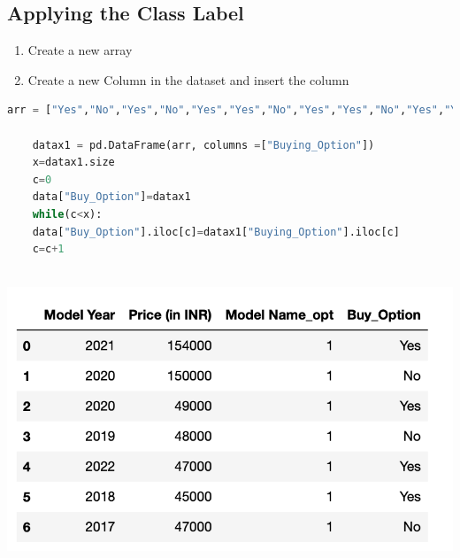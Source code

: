 \documentclass{article}
\begin{document}
\subsection{Applying the Class Label}
\begin{enumerate}
	\item Create a new array
	\item Create a new Column in the dataset and insert the column
\end{enumerate}

\begin{lstlisting}[language=Python]
	arr = ["Yes","No","Yes","No","Yes","Yes","No","Yes","Yes","No","Yes","Yes","No","Yes","Yes","No","Yes","Yes","No","Yes","Yes","No","Yes","Yes","No","Yes","Yes","No","Yes","Yes","No","Yes","Yes","No","Yes","Yes","No","Yes","Yes","No","Yes","Yes","No","Yes","Yes","No","Yes","Yes","No","Yes","Yes","No","Yes","Yes","No","Yes","Yes","No","Yes","Yes"]
	
	datax1 = pd.DataFrame(arr, columns =["Buying_Option"])
	x=datax1.size
	c=0
	data["Buy_Option"]=datax1
	while(c<x):
	data["Buy_Option"].iloc[c]=datax1["Buying_Option"].iloc[c]
	c=c+1
	
\end{lstlisting}

\includegraphics[scale=0.8]{images/7.png}
\end{document}
